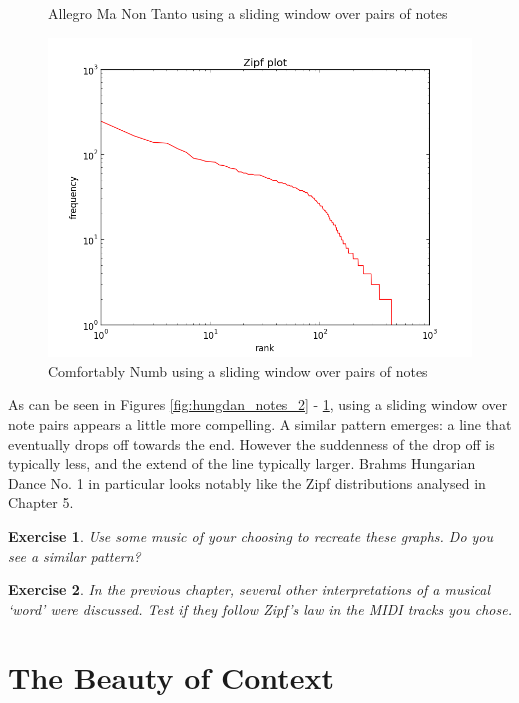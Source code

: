\documentclass[10pt]{book}
\newtheorem{exercise}{Exercise}[chapter]
\begin{document}
\begin{figure}[!htb]
  \caption{Allegro Ma Non Tanto using a sliding window over pairs of notes}\label{fig:rach_notes_2}
\endminipage\hfill
{}%
  \includegraphics[width=\linewidth]{comf_notes_2}
  \caption{Comfortably Numb using a sliding window over pairs of notes}\label{fig:comf_notes_2}
\endminipage
\end{figure}

As can be seen in Figures \ref{fig:hungdan_notes_2} - \ref{fig:comf_notes_2}, using a sliding window over note pairs appears a little more compelling. A similar pattern emerges: a line that eventually drops off towards the end. However the suddenness of the drop off is typically less, and the extend of the line typically larger. Brahms Hungarian Dance No. 1 in particular looks notably like the Zipf distributions analysed in Chapter 5.


\begin{exercise}
Use some music of your choosing to recreate these graphs. Do you see a similar pattern?
\end{exercise}

\begin{exercise}
In the previous chapter, several other interpretations of a musical `word' were discussed. Test if they follow Zipf's law in the MIDI tracks you chose.
\end{exercise}



\section{The Beauty of Context}
\end{document}
